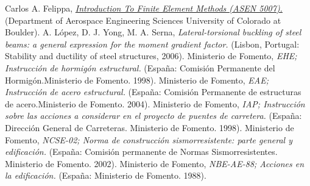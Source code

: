 


 Carlos A. Felippa,
{\it \href{http://www.colorado.edu/engineering/CAS/courses.d/IFEM.d/}{Introduction To Finite Element Methods (ASEN 5007).}} (Department of Aerospace Engineering Sciences University of Colorado at Boulder).
 A. López, D. J. Yong, M. A. Serna,
{\it Lateral-torsional buckling of steel beams: a general expression for the moment gradient factor.} (Lisbon, Portugal: Stability and ductility of steel structures, 2006).
 Ministerio de Fomento,
{\it EHE; Instrucción de hormigón estructural.} (España: Comisión Permanente del Hormigón.Ministerio de Fomento. 1998).
 Ministerio de Fomento,
{\it EAE; Instrucción de acero estructural.} (España: Comisión Permanente de estructuras de acero.Ministerio de Fomento. 2004).
 Ministerio de Fomento,
{\it IAP; Instrucción sobre las acciones a considerar en el proyecto de puentes de carretera.} (España: Dirección General de Carreteras. Ministerio de Fomento. 1998).
 Ministerio de Fomento,
{\it NCSE-02; Norma de construcción sismorresistente: parte general y edificación.} (España: Comisión permanente de Normas Sismorresistentes. Ministerio de Fomento. 2002).
 Ministerio de Fomento,
{\it NBE-AE-88; Acciones en la edificación.} (España: Ministerio de Fomento. 1988).
